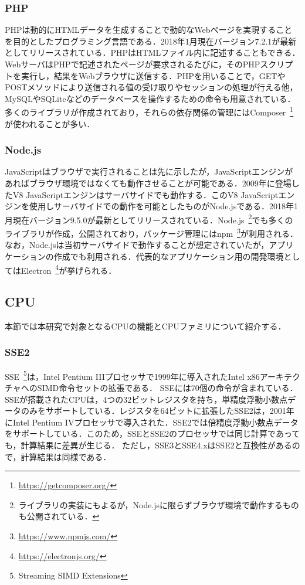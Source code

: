 \subsubsection{PHP}
PHPは動的にHTMLデータを生成することで動的なWebページを実現することを目的としたプログラミング言語である．2018年1月現在バージョン7.2.1が最新としてリリースされている．PHPはHTMLファイル内に記述することもできる．WebサーバはPHPで記述されたページが要求されるたびに，そのPHPスクリプトを実行し，結果をWebブラウザに送信する．PHPを用いることで，GETやPOSTメソッドにより送信される値の受け取りやセッションの処理が行える他，MySQLやSQLiteなどのデータベースを操作するための命令も用意されている．多くのライブラリが作成されており，それらの依存関係の管理にはComposer~\footnote{\url{https://getcomposer.org/}}が使われることが多い．
\subsubsection{Node.js}
JavaScriptはブラウザで実行されることは先に示したが，JavaScriptエンジンがあればブラウザ環境ではなくても動作させることが可能である．2009年に登場したV8 JavaScriptエンジンはサーバサイドでも動作する．このV8 JavaScriptエンジンを使用しサーバサイドでの動作を可能としたものがNode.jsである．2018年1月現在バージョン9.5.0が最新としてリリースされている．Node.js~\footnote{ライブラリの実装にもよるが，Node.jsに限らずブラウザ環境で動作するものも公開されている．}でも多くのライブラリが作成，公開されており，パッケージ管理にはnpm~\footnote{\url{https://www.npmjs.com/}}が利用される．なお，Node.jsは当初サーバサイドで動作することが想定されていたが，アプリケーションの作成でも利用される．代表的なアプリケーション用の開発環境としてはElectron~\footnote{\url{https://electronjs.org/}}が挙げられる．
\subsection{CPU}
本節では本研究で対象となるCPUの機能とCPUファミリについて紹介する．
\subsubsection{SSE2}
SSE~\footnote{Streaming SIMD Extensions}は，Intel Pentium IIIプロセッサで1999年に導入されたIntel x86アーキテクチャへのSIMD命令セットの拡張である． SSEには70個の命令が含まれている．SSEが搭載されたCPUは，4つの32ビットレジスタを持ち，単精度浮動小数点データのみをサポートしている．レジスタを64ビットに拡張したSSE2は，2001年にIntel Pentium IVプロセッサで導入された．SSE2では倍精度浮動小数点データをサポートしている．このため，SSEとSSE2のプロセッサでは同じ計算であっても，計算結果に差異が生じる．
ただし，SSE3とSSE4.xはSSE2と互換性があるので，計算結果は同様である．

